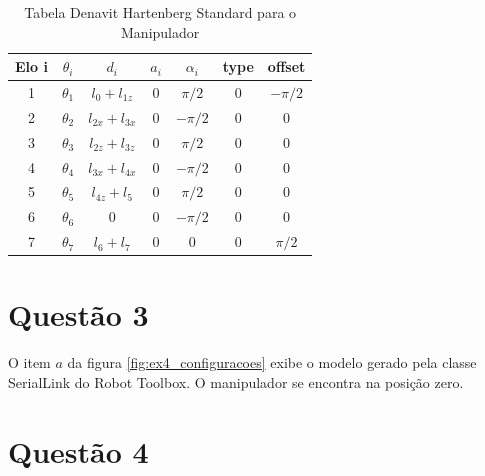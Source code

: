\documentclass[a4paper,11pt]{article}
\theoremstyle{mytheor}
\begin{document}
\begin{table}[!ht]
\centering
\caption{Tabela Denavit Hartenberg Standard para o Manipulador}
\label{tab:ex2_param_tabela_dh}
\begin{tabular}{|c|c|c|c|c|c|c|}
\hline
\textbf{Elo i} & \textbf{$\theta_i$} & \textbf{$d_i$} & \textbf{$a_i$} & \textbf{$\alpha_i$} & \textbf{type} & \textbf{offset} \\ \hline
1                & $\theta_1$            & $l_{0} + l_{1z}$     & $0$         & $\pi/2$               & $0$             & $-\pi/2$           \\ \hline
2                & $\theta_2$            & $l_{2x} + l_{3x}$    & $0$         & $-\pi/2$              & $0$             & $0$           \\ \hline
3                & $\theta_3$            & $l_{2z} + l_{3z}$    & $0$         & $\pi/2$               & $0$             & $0$               \\ \hline
4                & $\theta_4$            & $l_{3x} + l_{4x}$    & $0$         & $-\pi/2$              & $0$             & $0$               \\ \hline
5                & $\theta_5$            & $l_{4z} + l_{5}$     & $0$         & $\pi/2$               & $0$             & $0$               \\ \hline
6                & $\theta_6$            & $0$                  & $0$         & $-\pi/2$              & $0$             & $0$           \\ \hline
7                & $\theta_7$            & $l_6+l_7$            & $0$         & $0$                   & $0$             & $\pi/2$           \\ \hline
\end{tabular}
\end{table}



\section*{Questão 3}

O item $a$ da figura \ref{fig:ex4_configuracoes} exibe o modelo gerado pela classe SerialLink do Robot Toolbox. O manipulador se encontra na posição zero.

\section*{Questão 4}
\end{document}
